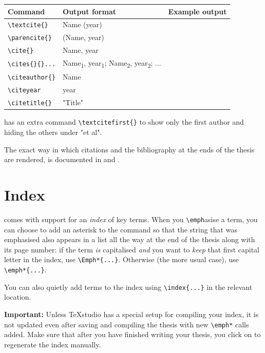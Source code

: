 \begin{tabular}{llp{6.5cm}}
	\bfseries Command & \bfseries Output format & \bfseries Example output \\\hline
	\verb|\textcite{}| & Name (year) & \textcite{bauwens_bpe-knockout_2023} \\
	\verb|\parencite{}| & (Name, year) & \parencite{bauwens_bpe-knockout_2023} \\
	\verb|\cite{}| 	    & Name, year & \cite{bauwens_bpe-knockout_2023} \\
	\verb|\cites{}{}...|   & Name\textsubscript1, year\textsubscript1; Name\textsubscript2, year\textsubscript2; ... & \cites{bauwens_bpe-knockout_2023}{mermin_whats_1989} \\\hline 
	
	\verb|\citeauthor{}| & Name & \citeauthor{bauwens_bpe-knockout_2023} \\
	\verb|\citeyear|	 & year &  \citeyear{bauwens_bpe-knockout_2023} \\
	\verb|\citetitle{}| & "Title" & \citetitle{bauwens_bpe-knockout_2023}
\end{tabular}

\repo has an extra command \verb|\textcitefirst{}| to show only the first author and hiding the others under "et al".

The exact way in which citations and the bibliography at the ends of the thesis are rendered, is documented in  and .

\section{Index}
\repo comes with support for an \emph*{index} of key terms. When you \verb|\emph|asise a term, you can choose to add an asterisk to the command so that the string that was emphasised also appears in a list all the way at the end of the thesis along with its page number: if the term \emph{is} capitalised \emph{and} you want to \emph{keep} that first capital letter in the index, use \verb|\Emph*{...}|. Otherwise (the more usual case), use \verb|\emph*{...}|.

You can also quietly add terms to the index using \verb|\index{...}| in the relevant location.

\begin{mdframed}
\textbf{Important:} Unless TeXstudio has a special setup for compiling your index, it is not updated even after saving and compiling the thesis with new \verb|\emph*| calls added. Make sure that after you have finished writing your thesis, you click on  to regenerate the index manually.
\end{mdframed}


